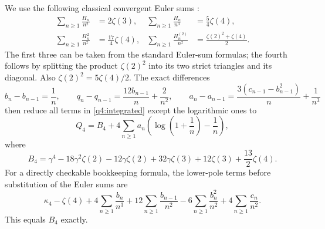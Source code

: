 We use the following classical convergent Euler sums
\cite[Equations~25.16.8 and 25.16.13]{DLMF}:
\begin{align*}
 \sum_{n\geq1}\frac{H_n}{n^2}&=2\zeta(3),&
 \sum_{n\geq1}\frac{H_n}{n^3}&=\frac54\zeta(4),\\
 \sum_{n\geq1}\frac{H_n^2}{n^2}&=\frac{17}4\zeta(4),&
 \sum_{n\geq1}\frac{H_n^{(2)}}{n^2}
     &=\frac{\zeta(2)^2+\zeta(4)}2.
\end{align*}
The first three can be taken from the standard Euler-sum formulas; the
fourth follows by splitting the product $\zeta(2)^2$ into its two strict
triangles and its diagonal.  Also $\zeta(2)^2=5\zeta(4)/2$.
The exact differences
\begin{equation}\label{q4:differences}
 b_n-b_{n-1}=\frac1n,\qquad
 q_n-q_{n-1}=\frac{12b_{n-1}}n+\frac2{n^2},\qquad
 a_n-a_{n-1}=\frac{3(c_{n-1}-b_{n-1}^2)}n+\frac1{n^3}
\end{equation}
then reduce all terms in \eqref{q4:integrated} except the logarithmic
ones to
\begin{equation}\label{q4:base}
 Q_4=B_4+4\sum_{n\geq1}a_n
          \left(\log\left(1+\frac1n\right)-\frac1n\right),
\end{equation}
where
\[
 B_4=\gamma^4-18\gamma^2\zeta(2)-12\gamma\zeta(2)
             +32\gamma\zeta(3)+12\zeta(3)+\frac{13}2\zeta(4).
\]
For a directly checkable bookkeeping formula, the lower-pole terms before
substitution of the Euler sums are
\[
 \kappa_4-\zeta(4)
 +4\sum_{n\geq1}\frac{b_n}{n^3}
 +12\sum_{n\geq1}\frac{b_{n-1}}{n^2}
 -6\sum_{n\geq1}\frac{b_n^2}{n^2}
 +4\sum_{n\geq1}\frac{c_n}{n^2}.
\]
This equals $B_4$ exactly.

